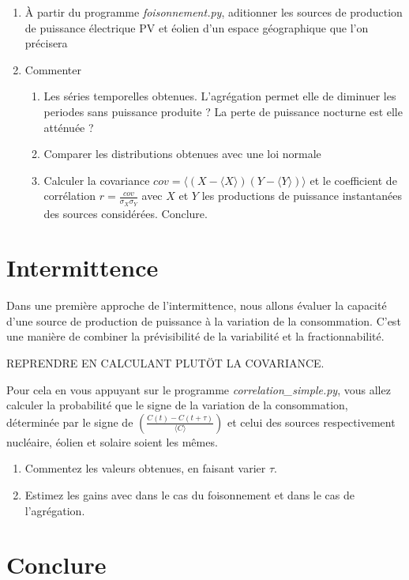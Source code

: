 \documentclass[12pt,a4]{article}
\newcommand{\tmtextit}[1]{{\itshape{#1}}}
\begin{document}
\begin{enumerate}
  \item À partir du programme \tmtextit{foisonnement.py}, aditionner les
  sources de production de puissance électrique PV et éolien d'un espace géographique que l'on précisera 
  
  \item Commenter
  \begin{enumerate}
    \item Les séries temporelles obtenues. L'agrégation permet elle de
    diminuer les periodes sans puissance produite ? La perte de puissance
    nocturne est elle atténuée ?
    
    \item Comparer les distributions obtenues avec une loi normale
    
    \item Calculer la covariance $cov=\langle (X-\langle X \rangle)(Y - \langle Y \rangle)\rangle $ et le coefficient de corrélation $r=\frac{cov}{\sigma_X \sigma_Y}$ avec $X$ et $Y$ les productions de puissance instantanées des sources considérées. Conclure.
    
  \end{enumerate}
\end{enumerate}

\section{Intermittence}

Dans une première approche de l'intermittence, nous allons évaluer la
capacité d'une source de production de puissance à la variation de la consommation. C'est une manière de combiner la prévisibilité de la variabilité et la fractionnabilité.

REPRENDRE EN CALCULANT PLUTÖT LA COVARIANCE.

Pour cela en vous appuyant sur le programme \tmtextit{correlation\_simple.py},
vous allez calculer la probabilité que le signe de la variation de la
consommation, déterminée par le signe de $\left( \frac{C (t) - C (t +
\tau)}{\langle C \rangle} \right)$ et celui des sources respectivement
nucléaire, éolien et solaire soient les mêmes.
\begin{enumerate}
	\item Commentez les valeurs obtenues, en faisant varier $\tau$.
	
	\item Estimez les gains avec dans le cas du foisonnement et dans le cas de l'agrégation.
	
\end{enumerate}

\section{Conclure}
\end{document}
